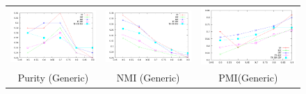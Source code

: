 \documentclass[10pt,a5paper,twoside]{article}
\begin{document}
\begin{figure}[t!]
\begin{center}
\resizebox{14cm}{!} 
{
	\begin{tabular}{ccc}
		\includegraphics[width=140pt]{Figs/1-1.pdf} & 
		\includegraphics[width=140pt]{Figs/1-2.pdf} & 
		\includegraphics[width=140pt]{Figs/1-3.pdf} \\  
	
		{\footnotesize Purity (Generic)} & {\footnotesize NMI (Generic)} & 
		{\footnotesize PMI(Generic)}\\
	

\end{tabular}}
\end{center}
\end{figure}
\end{document}
